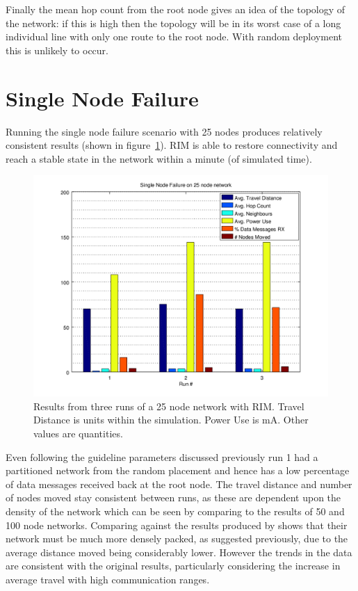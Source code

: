 \documentclass[authoryearcitations]{UoYCSproject}
\begin{document}
Finally the mean hop count from the root node gives an idea of the topology of the network: if this is high then the topology will be in its worst case of a long individual line with only one route to the root node. With random deployment this is unlikely to occur.

\section{Single Node Failure}

Running the single node failure scenario with 25 nodes produces relatively consistent results (shown in figure~\ref{fig:singlefail_25node}). RIM is able to restore connectivity and reach a stable state in the network within a minute (of simulated time).

\begin{figure}
 \centering
    \includegraphics[width=\textwidth]{figures/singlefail_25node.png}
    \caption[Results from three runs of a 25 node network with RIM.]{Results from three runs of a 25 node network with RIM. Travel Distance is units within the simulation. Power Use is mA. Other values are quantities.}
    \label{fig:singlefail_25node}
\end{figure}

Even following the guideline parameters discussed previously run 1 had a partitioned network from the random placement and hence has a low percentage of data messages received back at the root node. The travel distance and number of nodes moved stay consistent between runs, as these are dependent upon the density of the network which can be seen by comparing to the results of 50 and 100 node networks. Comparing against the results produced by \citeauthor*{Younis2010} shows that their network must be much more densely packed, as suggested previously, due to the average distance moved being considerably lower. However the trends in the data are consistent with the original results, particularly considering the increase in average travel with high communication ranges.
\end{document}
